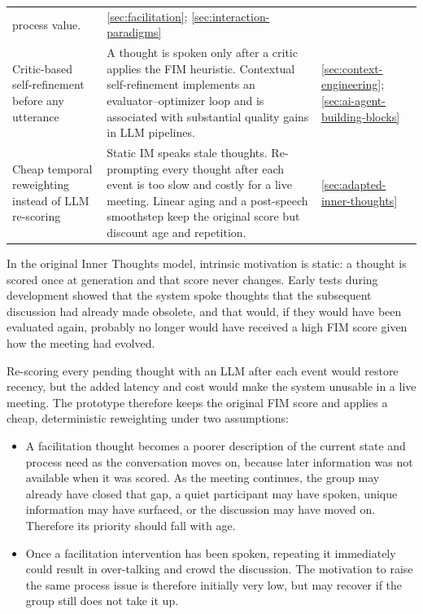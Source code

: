 \begin{table}[H]
\begin{tabularx}{\textwidth}{@{}
      >{\raggedright\arraybackslash}p{2.85cm}
      >{\raggedright\arraybackslash}X
      >{\raggedright\arraybackslash}p{3.55cm}
    @{}}
    process value.
    & \autoref{sec:facilitation};
    \autoref{sec:interaction-paradigms} \\
    \addlinespace
    Critic-based self-refinement before any utterance
    & A thought is spoken only after a critic applies the FIM heuristic. Contextual self-refinement
    implements an evaluator--optimizer loop and is associated with substantial quality gains in
    LLM pipelines.
    & \autoref{sec:context-engineering};
    \autoref{sec:ai-agent-building-blocks} \\
    \addlinespace
    Cheap temporal reweighting instead of LLM re-scoring
    & Static IM speaks stale thoughts. Re-prompting every thought after each event is too slow and
    costly for a live meeting. Linear aging and a post-speech smoothstep keep the original score
    but discount age and repetition.
    & \autoref{sec:adapted-inner-thoughts} \\
    \bottomrule
  \end{tabularx}
\end{table}
\FloatBarrier

\label{sec:dynamic-im}

In the original Inner Thoughts model, intrinsic motivation is static: a thought is scored once at
generation and that score never changes. Early tests during development showed that the system spoke thoughts
that the subsequent discussion had already made obsolete, and that would, if they would have been evaluated
again, probably no longer would have received a high FIM score given how the meeting had evolved.


Re-scoring every pending thought with an LLM after each event would restore recency, but the added
latency and cost would make the system unusable in a live meeting. The prototype therefore keeps the
original FIM score and applies a cheap, deterministic reweighting under two assumptions:
\begin{itemize}
  \item A facilitation thought becomes a poorer description of the current state and process need as the
    conversation moves on, because later information was not available when it was scored.
    As the meeting continues, the group may already have closed that gap, a quiet participant may have
    spoken, unique information may have surfaced, or the discussion may have moved on.
    Therefore its priority should fall with age.
  \item Once a facilitation intervention has been spoken, repeating it immediately could result in over-talking and
    crowd the discussion. The motivation to raise the same process issue is therefore initially very low, but
    may recover if the group still does not take it up.
\end{itemize}

